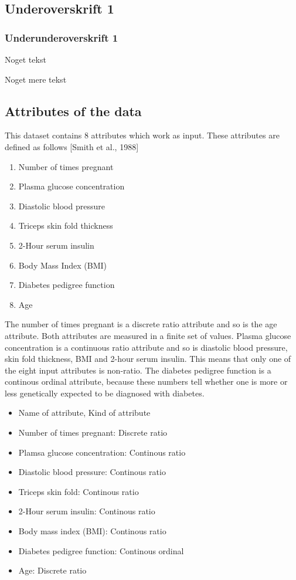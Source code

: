 \subsection{Underoverskrift 1}

\subsubsection{Underunderoverskrift 1}

Noget tekst

Noget mere tekst


\subsection{Attributes of the data}
This dataset contains 8 attributes which work as input. These attributes are defined as follows
[Smith et al., 1988]
\begin{enumerate}
\item Number of times pregnant
\item Plasma glucose concentration
\item Diastolic blood pressure
\item Triceps skin fold thickness
\item 2-Hour serum insulin
\item Body Mass Index (BMI)
\item Diabetes pedigree function
\item Age
\end{enumerate}

The number of times pregnant is a discrete ratio attribute and so is
the age attribute. Both attributes are measured in a finite set of values.
Plasma glucose concentration is a continuous ratio attribute
and so is diastolic blood pressure, skin fold thickness, BMI and 2-hour serum
insulin. This means that only one of the eight input attributes is non-ratio.
The diabetes pedigree function is a continous ordinal attribute, because these
numbers tell whether one is more or less genetically expected to be diagnosed
with diabetes.
\bigskip

\begin{itemize}
\item Name of attribute, Kind of attribute
\item Number of times pregnant: Discrete ratio
\item Plamsa glucose concentration: Continous ratio
\item Diastolic blood pressure: Continous ratio
\item Triceps skin fold: Continous ratio
\item 2-Hour serum insulin: Continous ratio
\item Body mass index (BMI): Continous ratio
\item Diabetes pedigree function: Continous ordinal
\item Age: Discrete ratio
\end{itemize}



